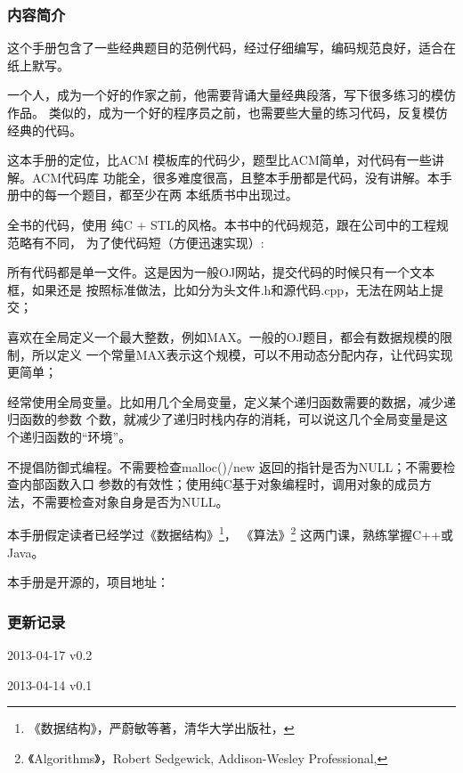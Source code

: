 \subsubsection{内容简介}
这个手册包含了一些经典题目的范例代码，经过仔细编写，编码规范良好，适合在纸上默写。

一个人，成为一个好的作家之前，他需要背诵大量经典段落，写下很多练习的模仿作品。
类似的，成为一个好的程序员之前，也需要些大量的练习代码，反复模仿经典的代码。

这本手册的定位，比ACM 模板库的代码少，题型比ACM简单，对代码有一些讲解。ACM代码库
功能全，很多难度很高，且整本手册都是代码，没有讲解。本手册中的每一个题目，都至少在两
本纸质书中出现过。

全书的代码，使用 纯C + STL的风格。本书中的代码规范，跟在公司中的工程规范略有不同，
为了使代码短（方便迅速实现）:

\begindot
\item 所有代码都是单一文件。这是因为一般OJ网站，提交代码的时候只有一个文本框，如果还是
按照标准做法，比如分为头文件.h和源代码.cpp，无法在网站上提交；

\item 喜欢在全局定义一个最大整数，例如MAX。一般的OJ题目，都会有数据规模的限制，所以定义
一个常量MAX表示这个规模，可以不用动态分配内存，让代码实现更简单；

\item 经常使用全局变量。比如用几个全局变量，定义某个递归函数需要的数据，减少递归函数的参数
个数，就减少了递归时栈内存的消耗，可以说这几个全局变量是这个递归函数的“环境”。

\item 不提倡防御式编程。不需要检查malloc()/new 返回的指针是否为NULL；不需要检查内部函数入口
参数的有效性；使用纯C基于对象编程时，调用对象的成员方法，不需要检查对象自身是否为NULL。
\myenddot

本手册假定读者已经学过《数据结构》\footnote{《数据结构》，严蔚敏等著，清华大学出版社，
}，
《算法》\footnote{《Algorithms》，Robert Sedgewick, Addison-Wesley Professional, }
这两门课，熟练掌握C++或Java。

本手册是开源的，项目地址：


\subsubsection{更新记录}
\begindot
\item[] 2013-04-17 v0.2
\item[] 2013-04-14 v0.1
\myenddot
